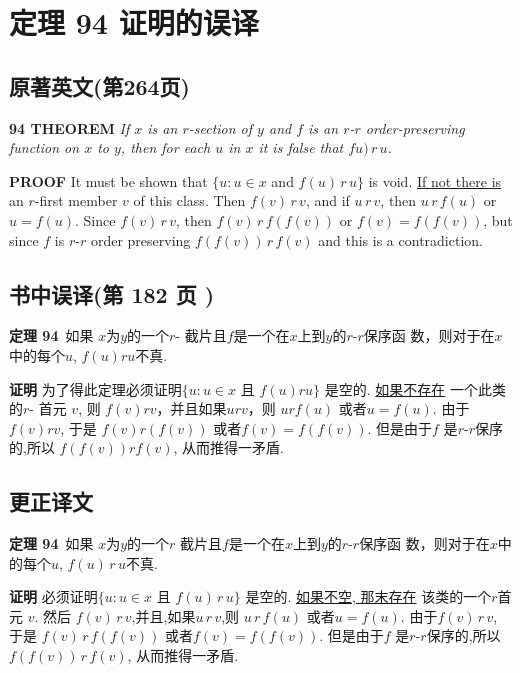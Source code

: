 \documentclass[zihao=-4,a4paper]{ctexart}
\begin{document}
\section{定理 94 证明的误译}

\subsection{原著英文(\cite{jkelley1975}第264页)} 
{\bf 94 THEOREM} 
{\sl
	If $x$ is an $r$-section of $y$ and $f$ is an $r$-$r$ order-preserving function on $x$ to $y$, 
	then for each $u$ in $x$ it is false that $fu)\, r\, u$.
}

{\bf PROOF}
It must be shown that $\{u: u \in x $ and $ f(u) \, r\, u\}$ is void. 
\underline{If not there is} an $r$-first member $v$ of this class.
Then $f(v)\, r\, v $, and if $u\, r\, v$, then $u\, r\, f(u)$ or $u = f(u)$.
Since $f(v)\, r\, v$, then 
\underline{$f(v)\, r\, f(f(v))$}
or $f(v) = f(f(v))$, but since $f$ is $r$-$r$ order preserving
$f(f(v))\, r\, f(v)$ and this is a contradiction.

\subsection{书中误译(\cite{jkelley2010zh}第 182 页 )} 
{\bf 定理 94}\,
{\kaishu
如果 $x$为$y$的一个$r$- 截片且$f$是一个在$x$上到$y$的$r$-$r$保序函
数，则对于在$x$中的每个$u$, $f(u)ru$不真.
}

{\bf 证明}
为了得此定理必须证明$\{u: u \in x $ 且 $ f(u) ru\}$ 是空的. 
\underline{如果不存在}\! 一个此类的$r$- 首元 $v$, 
则 $f(v) r  v $，并且如果$u r v$，则 $u r f(u)$
或者$u = f(u)$.
由于$f(v)rv$, 于是
\underline{$f(v)r(f(v))$}
或者$f(v)=f(f(v))$. 但是由于$f$ 是$r$-$r$保序的,所以
$f(f(v))rf(v)$, 从而推得一矛盾.

\subsection{更正译文} 
{\bf 定理 94}\,
{\kaishu
	如果 $x$为$y$的一个$r$ 截片且$f$是一个在$x$上到$y$的$r$-$r$保序函
	数，则对于在$x$中的每个$u$, $f(u)\, r\, u$不真.
}

{\bf 证明}
必须证明$\{u: u \in x $ 且 $ f(u) \, r\, u\}$ 是空的. 
\underline{如果不空, 那末存在}\! 该类的一个$r$首元 $v$.
然后 $f(v)\, r\, v $,并且,如果$u\, r\, v$,则 $u\, r\, f(u)$
或者$u = f(u)$.
由于$f(v)\, r\, v$, 于是
\underline{$f(v)\, r\, f(f(v))$}
或者$f(v)=f(f(v))$. 但是由于$f$ 是$r$-$r$保序的,所以
$f(f(v))\, r\, f(v)$, 从而推得一矛盾.
\end{document}
